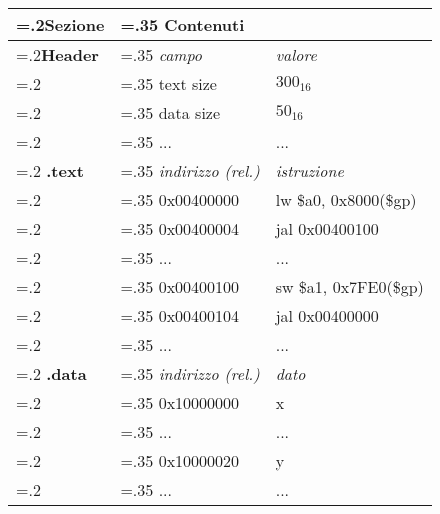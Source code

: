 \documentclass[varwidth=6in]{standalone}
\providecommand\lightrule{%
	\arrayrulecolor{black!30}%
	\midrule[\lightrulewidth]%
	\arrayrulecolor{black}}
\begin{document}
	\begin{tabularx}{\textwidth}{ >{\hsize=.2\textwidth}X >{\hsize=.35\textwidth}X  X
		}
		\toprule
			Sezione & Contenuti & \\
		\midrule
			\textbf{Header} & \emph{campo} & \emph{valore} \\\lightrule
			& text size & $300_{16}$ \\
			& data size & $50_{16}$ \\
			& ... & ... \\\lightrule
			\textbf{.text} & \emph{indirizzo (rel.)} & \emph{istruzione} \\\lightrule
			& 0x00400000 & lw \$a0, 0x8000(\$gp) \\
			& 0x00400004 & jal 0x00400100 \\
			& ... & ... \\
			& 0x00400100 & sw \$a1, 0x7FE0(\$gp) \\
			& 0x00400104 & jal 0x00400000 \\
			& ... & ... \\\lightrule
			\textbf{.data} & \emph{indirizzo (rel.)} & \emph{dato} \\\lightrule
			& 0x10000000 & x \\
			& ... & ... \\
			& 0x10000020 & y \\
			& ... & ... \\
		\bottomrule
	\end{tabularx}
\end{document}
